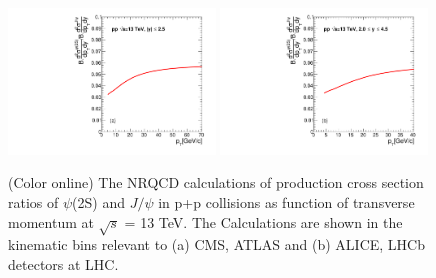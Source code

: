 \documentclass[aps,prc,preprint,superscriptaddress,showpacs,showkeys,amsmath]{revtex4-1}
\begin{document}
\begin{figure}
\includegraphics[width=0.49\textwidth]{Figures/Predict/Fig_ATLAS_D2NDPtDy_RootS13TeV_DirectPsi_DirectJPsi_Y2525.pdf}
\includegraphics[width=0.49\textwidth]{Figures/Predict/Fig_ALICE_D2NDPtDy_RootS13TeV_DirectPsi_DirectJPsi_Y2045.pdf}
\caption{(Color online) The NRQCD calculations of production cross section ratios of $\psi$(2S) and $J/\psi$
  in p+p collisions as function of transverse momentum at $\sqrt{s}$ = 13 TeV. The Calculations are shown in 
  the kinematic bins relevant to (a) CMS, ATLAS and (b) ALICE, LHCb detectors at LHC. 
}
\label{Fig:RatioSigma_13TeV}
\end{figure}














\end{document}
